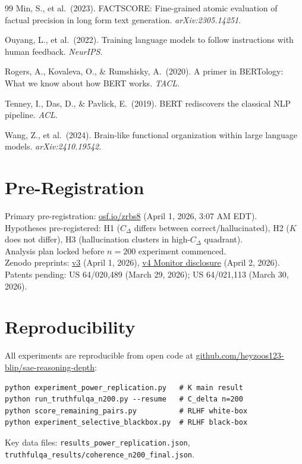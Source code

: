 \documentclass[10pt]{article}
\begin{document}
\begin{thebibliography}{99}
Min, S., et al.\ (2023).
FACTSCORE: Fine-grained atomic evaluation of factual precision in long form text generation.
\textit{arXiv:2305.14251}.

Ouyang, L., et al.\ (2022).
Training language models to follow instructions with human feedback.
\textit{NeurIPS}.

Rogers, A., Kovaleva, O., \& Rumshisky, A.\ (2020).
A primer in BERTology: What we know about how BERT works.
\textit{TACL}.

Tenney, I., Das, D., \& Pavlick, E.\ (2019).
BERT rediscovers the classical NLP pipeline.
\textit{ACL}.

Wang, Z., et al.\ (2024).
Brain-like functional organization within large language models.
\textit{arXiv:2410.19542}.

\end{thebibliography}

\appendix

\section{Pre-Registration}

Primary pre-registration: \href{https://osf.io/zrbs8}{osf.io/zrbs8} (April 1, 2026, 3:07 AM EDT).\\
Hypotheses pre-registered: H1 ($C_{\Delta}$ differs between correct/hallucinated), H2 ($K$ does not differ), H3 (hallucination clusters in high-$C_{\Delta}$ quadrant).\\
Analysis plan locked before $n{=}200$ experiment commenced.\\
Zenodo preprints: \href{https://doi.org/10.5281/zenodo.19364702}{v3} (April 1, 2026), \href{https://doi.org/10.5281/zenodo.19382453}{v4 Monitor disclosure} (April 2, 2026).\\
Patents pending: US 64/020,489 (March 29, 2026); US 64/021,113 (March 30, 2026).

\section{Reproducibility}

All experiments are reproducible from open code at \href{https://github.com/heyzoos123-blip/sae-reasoning-depth}{github.com/heyzoos123-blip/sae-reasoning-depth}:

\begin{verbatim}
python experiment_power_replication.py   # K main result
python run_truthfulqa_n200.py --resume   # C_delta n=200
python score_remaining_pairs.py          # RLHF white-box
python experiment_selective_blackbox.py  # RLHF black-box
\end{verbatim}

Key data files: \texttt{results\_power\_replication.json}, \texttt{truthfulqa\_results/coherence\_n200\_final.json}.
\end{document}
